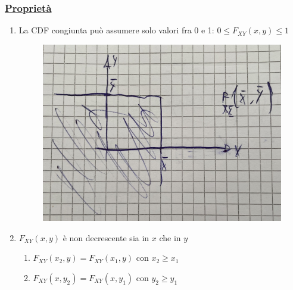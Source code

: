 \documentclass{article}
\begin{document}
\subsubsection{\underline{Proprietà}}
\begin{enumerate}
    \item La CDF congiunta può assumere solo valori fra 0 e 1: $0 \leq F_{XY}(x,y) \leq 1$
    \begin{figure}[ht]
    \centering
    \includegraphics[scale=0.16]{images/70.Prop1CDFVettA.jpeg}
    \end{figure}
    \item $F_{XY}(x,y)$ è non decrescente sia in $x$ che in $y$
    \begin{enumerate}[label=\alph*]
        \item $F_{XY}(x_2,y) = F_{XY}(x_1,y)$ con $x_2 \geq x_1$
        \item $F_{XY}(x,y_2) = F_{XY}(x,y_1)$ con $y_2 \geq y_1$
    \end{enumerate}

\end{enumerate}
\end{document}
